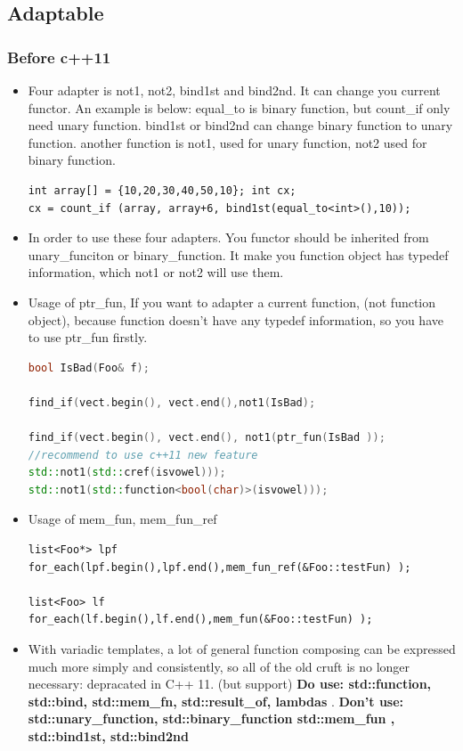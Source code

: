 \documentclass[a4paper,11pt,twoside]{book}
\begin{document}
\subsection{Adaptable}
\subsubsection{Before c++11}
\begin{itemize}
\item Four adapter is not1, not2, bind1st and bind2nd. It can change you current functor. An example is below: equal\_to is binary function, but count\_if only need unary function.  bind1st or bind2nd can change binary function to unary function.  another function is not1, used for unary function, not2 used for binary function.
\begin{lstlisting}[numbers=none]
int array[] = {10,20,30,40,50,10}; int cx;
cx = count_if (array, array+6, bind1st(equal_to<int>(),10));
\end{lstlisting}

\item In order to use these four adapters. You functor should be inherited from unary\_funciton or binary\_function. It make you function object has typedef information, which not1 or not2 will use them.

\item Usage of ptr\_fun, If you want to adapter a current function, (not function object), because function doesn't have any typedef information, so you have to use ptr\_fun firstly.
\begin{lstlisting}[frame=single, language=c++]
bool IsBad(Foo& f);

find_if(vect.begin(), vect.end(),not1(IsBad);  

find_if(vect.begin(), vect.end(), not1(ptr_fun(IsBad )); 
//recommend to use c++11 new feature
std::not1(std::cref(isvowel)));
std::not1(std::function<bool(char)>(isvowel)));
\end{lstlisting}




\item Usage of mem\_fun, mem\_fun\_ref
\begin{lstlisting}[numbers=none]
list<Foo*> lpf
for_each(lpf.begin(),lpf.end(),mem_fun_ref(&Foo::testFun) );

list<Foo> lf
for_each(lf.begin(),lf.end(),mem_fun(&Foo::testFun) );
\end{lstlisting}

\item With variadic templates, a lot of general function composing can be expressed much more simply and consistently, so all of the old cruft is no longer necessary: depracated in C++ 11. (but support)
\textbf{Do use: std::function, std::bind, std::mem\_fn, std::result\_of, lambdas }.  \textbf{Don't use: std::unary\_function, std::binary\_function
std::mem\_fun , std::bind1st, std::bind2nd}

\end{itemize}
\end{document}
